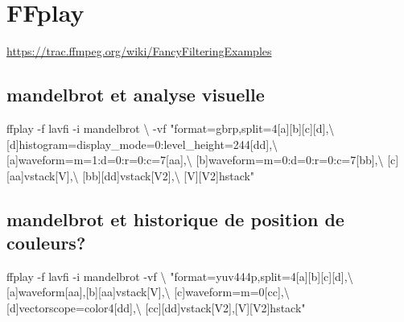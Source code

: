\documentclass[
  french,
]{book}
\newenvironment{Shaded}{\begin{snugshade}}{\end{snugshade}}
\newcommand{\AttributeTok}[1]{\textcolor[rgb]{0.77,0.63,0.00}{#1}}
\newcommand{\DataTypeTok}[1]{\textcolor[rgb]{0.13,0.29,0.53}{#1}}
\newcommand{\ExtensionTok}[1]{#1}
\newcommand{\NormalTok}[1]{#1}
\newcommand{\StringTok}[1]{\textcolor[rgb]{0.31,0.60,0.02}{#1}}
\begin{document}
\hypertarget{ffplay}{%
\section{FFplay}\label{ffplay}}

\url{https://trac.ffmpeg.org/wiki/FancyFilteringExamples}

\hypertarget{mandelbrot-et-analyse-visuelle}{%
\subsection{mandelbrot et analyse visuelle}\label{mandelbrot-et-analyse-visuelle}}

\begin{Shaded}
\begin{Highlighting}[]
\ExtensionTok{ffplay} \AttributeTok{{-}f}\NormalTok{ lavfi }\AttributeTok{{-}i}\NormalTok{ mandelbrot }\DataTypeTok{\textbackslash{}}
\NormalTok{{-}vf }\StringTok{"format=gbrp,split=4[a][b][c][d],}\DataTypeTok{\textbackslash{}}
\StringTok{[d]histogram=display\_mode=0:level\_height=244[dd],}\DataTypeTok{\textbackslash{}}
\StringTok{[a]waveform=m=1:d=0:r=0:c=7[aa],}\DataTypeTok{\textbackslash{}}
\StringTok{[b]waveform=m=0:d=0:r=0:c=7[bb],}\DataTypeTok{\textbackslash{}}
\StringTok{[c][aa]vstack[V],}\DataTypeTok{\textbackslash{}}
\StringTok{[bb][dd]vstack[V2],}\DataTypeTok{\textbackslash{}}
\StringTok{[V][V2]hstack"}
\end{Highlighting}
\end{Shaded}

\hypertarget{mandelbrot-et-historique-de-position-de-couleurs}{%
\subsection{mandelbrot et historique de position de couleurs?}\label{mandelbrot-et-historique-de-position-de-couleurs}}

\begin{Shaded}
\begin{Highlighting}[]
\ExtensionTok{ffplay} \AttributeTok{{-}f}\NormalTok{ lavfi }\AttributeTok{{-}i}\NormalTok{ mandelbrot }\AttributeTok{{-}vf} \DataTypeTok{\textbackslash{}}
\StringTok{"format=yuv444p,split=4[a][b][c][d],}\DataTypeTok{\textbackslash{}}
\StringTok{[a]waveform[aa],[b][aa]vstack[V],}\DataTypeTok{\textbackslash{}}
\StringTok{[c]waveform=m=0[cc],}\DataTypeTok{\textbackslash{}}
\StringTok{[d]vectorscope=color4[dd],}\DataTypeTok{\textbackslash{}}
\StringTok{[cc][dd]vstack[V2],[V][V2]hstack"}
\end{Highlighting}
\end{Shaded}
\end{document}
